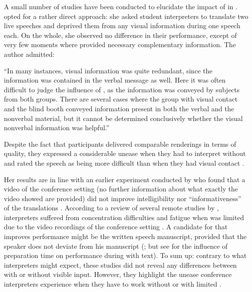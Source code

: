 \documentclass[output=paper]{LSP/langsci}
\begin{document}
A small number of studies have been conducted to elucidate the impact of  in . \citet{Rennert2008} opted for a rather direct approach: she asked student interpreters to translate two live speeches and deprived them from any visual information during one speech each. On the whole, she observed no difference in their  performance, except of very few moments where  provided necessary complementary information. The author admitted: 

``In many instances, visual information was quite redundant, since the information was contained in the verbal message as well. Here it was often difficult to judge the influence of , as the information was conveyed by subjects from both groups. There are several cases where the group with visual contact and the blind booth conveyed information present in both the verbal and the nonverbal material, but it cannot be determined conclusively whether the visual nonverbal information was helpful.'' \citep[214]{Rennert2008}

\largerpage
Despite the fact that participants delivered comparable renderings in terms of quality, they expressed a considerable unease when they had to interpret without  and rated the speech as being more difficult than when they had visual contact \citep{Rennert2008}.

Her results are in line with an earlier experiment conducted by \citet{Anderson1994} who found that a video of the conference setting (no further information about what exactly the video showed are provided) did not improve intelligibility nor ``informativeness'' \citep[106]{Anderson1994} of the translations \citep{Anderson1994}. According to a review of several remote  studies by \citet{MoserMercer2005}, interpreters suffered from concentration difficulties and fatigue when  was limited due to the video recordings of the conference setting \citep{MoserMercer2005}. A candidate for  that improves performance might be the written speech manuscript, provided that the speaker does not deviate from his manuscript (\citealt{Lambert2004}; but see \citet{DeLaet2005} for the influence of preparation time on performance during  with text). To sum up: contrary to what interpreters might expect, these studies did not reveal any differences between  with or without visible input. However, they highlight the unease conference interpreters experience when they have to work without or with limited .
\end{document}
